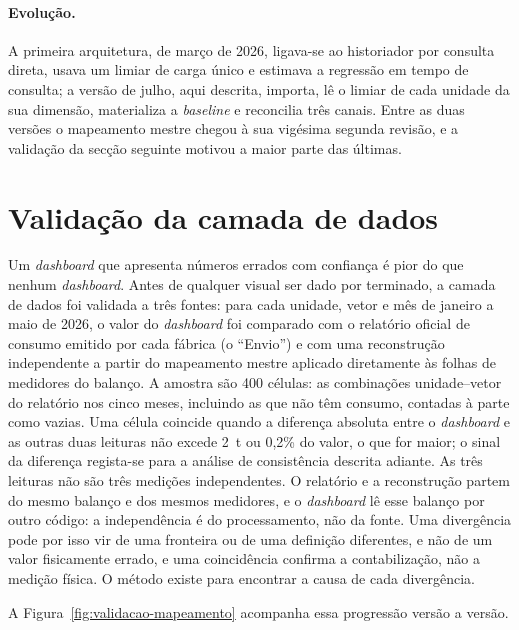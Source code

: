 \paragraph{Evolução.} A primeira arquitetura, de março de 2026, ligava-se
ao historiador por consulta direta, usava um limiar de carga único e
estimava a regressão em tempo de consulta; a versão de julho, aqui
descrita, importa, lê o limiar de cada unidade da sua dimensão,
materializa a \emph{baseline} e reconcilia três canais. Entre as duas
versões o mapeamento mestre chegou à sua vigésima segunda revisão, e a
validação da secção seguinte motivou a maior parte das últimas.

\section{Validação da camada de dados}
\label{sec:validacao-dados}

Um \emph{dashboard} que apresenta números errados com confiança é pior do
que nenhum \emph{dashboard}. Antes de qualquer visual ser dado por
terminado, a camada de dados foi validada a três fontes: para cada
unidade, vetor e mês de janeiro a maio de 2026, o valor do
\emph{dashboard} foi comparado com o relatório oficial de consumo emitido
por cada fábrica (o ``Envio'') e com uma reconstrução independente a
partir do mapeamento mestre aplicado diretamente às folhas de medidores do
balanço. A amostra são 400 células: as combinações unidade--vetor do
relatório nos cinco meses, incluindo as que não têm consumo, contadas à
parte como vazias. Uma célula coincide quando a diferença absoluta entre o
\emph{dashboard} e as outras duas leituras não excede 2~t ou 0,2\% do valor,
o que for maior; o sinal da diferença regista-se para a análise de
consistência descrita adiante. As três leituras não são três medições
independentes. O relatório e a reconstrução partem do mesmo balanço e dos
mesmos medidores, e o \emph{dashboard} lê esse balanço por outro código:
a independência é do processamento, não da fonte. Uma divergência pode por
isso vir de uma fronteira ou de uma definição diferentes, e não de um valor
fisicamente errado, e uma coincidência confirma a contabilização, não a
medição física. O método existe para encontrar a causa de cada
divergência.

A Figura~\ref{fig:validacao-mapeamento} acompanha essa progressão versão a versão.

